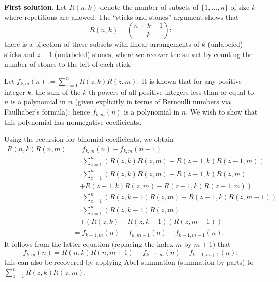 \documentclass[amssymb,twocolumn,pra,10pt,aps]{revtex4-1}
\begin{document}
\begin{itemize}
\noindent
\textbf{First solution.}
Let $R(n,k)$ denote the number of subsets of $\{1,...,n\}$ of size $k$ where repetitions are allowed. 
The ``sticks and stones'' argument shows that 
\[
R(n,k)=\binom{n+k-1}{k}:
\]
there is a bijection of these subsets with linear arrangements of $k$ (unlabeled) sticks and $z-1$ (unlabeled) stones,
where we recover the subset by counting the number of stones to the left of each stick.

Let $f_{k,m}(n) := \sum_{z=1}^n R(z,k)R(z,m)$. 
It is known that for any positive integer $k$, the sum of the $k$-th powers of all positive integers less than or equal to $n$ is a polynomial in $n$ (given explicitly in terms of Bernoulli numbers via Faulhaber's formula); hence $f_{k,m}(n)$ is a polynomial in $n$. 
We wish to show that this polynomial has nonnegative coefficients.

Using the recursion for binomial coefficients, we obtain
\begin{align*}
R(n,k)R(n,m) &= f_{k,m}(n)-f_{k,m}(n-1) \\
&= \sum_{z=1}^n \left( R(z,k)R(z,m)-R(z-1,k)R(z-1,m)\right)\\
&= \sum_{z=1}^n \left( R(z,k)R(z,m)-R(z-1,k)R(z,m) \right.\\
&\quad \left. +R(z-1,k)R(z,m)-R(z-1,k)R(z-1,m) \right) \\
&= \sum_{z=1}^n \left( R(z,k-1)R(z,m)+R(z-1,k)R(z,m-1) \right) \\
&= \sum_{z=1}^n \left( R(z,k-1)R(z,m) \right. \\
&\quad \left. +(R(z,k)-R(z,k-1))R(z,m-1) \right)\\
&= f_{k-1,m}(n)+f_{k,m-1}(n)-f_{k-1,m-1}(n).
\end{align*}
It follows from the latter equation (replacing the index $m$ by $m+1$) that
\begin{equation} \label{eq:summation recurrence}
f_{k,m}(n) = R(n,k)R(n,m+1) + f_{k-1,m}(n) - f_{k-1,m+1}(n);
\end{equation}
this can also be recovered by applying Abel summation (summation by parts) to
$\sum_{z=1}^n R(z,k) R(z,m)$.


\end{itemize}
\end{document}
